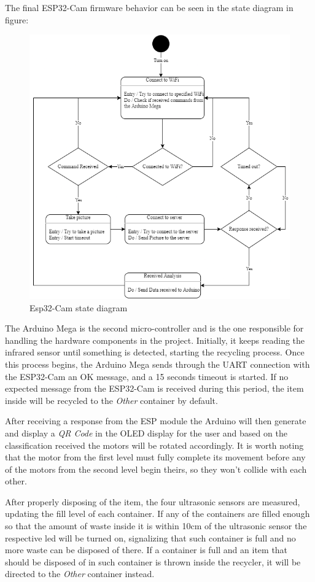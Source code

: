 \documentclass[a4paper,11pt]{article}
\begin{document}
The final ESP32-Cam firmware behavior can be seen in the state diagram in figure:

\begin{figure}[H]
  \centering
  \includegraphics[width=12cm]{Figures/State Chart Esp32.png}
  \caption{\small{Esp32-Cam state diagram}}
  \label{fig:espState}
\end{figure}

The Arduino Mega is the second micro-controller and is the one responsible for handling the hardware components in the project. Initially, it keeps reading the infrared sensor until something is detected, starting the recycling process. Once this process begins, the Arduino Mega sends through the UART connection with the ESP32-Cam an OK message, and a 15 seconds timeout is started. If no expected message from the ESP32-Cam is received during this period, the item inside will be recycled to the \textit{Other} container by default.

After receiving a response from the ESP module the Arduino will then generate and display a \textit{QR Code} in the OLED display for the user and based on the classification received the motors will be rotated accordingly. It is worth noting that the motor from the first level must fully complete its movement before any of the motors from the second level begin theirs, so they won't collide with each other.

After properly disposing of the item, the four ultrasonic sensors are measured, updating the fill level of each container. If any of the containers are filled enough so that the amount of waste inside it is within 10cm of the ultrasonic sensor the respective led will be turned on, signalizing that such container is full and no more waste can be disposed of there. If a container is full and an item that should be disposed of in such container is thrown inside the recycler, it will be directed to the \textit{Other} container instead.
\end{document}
